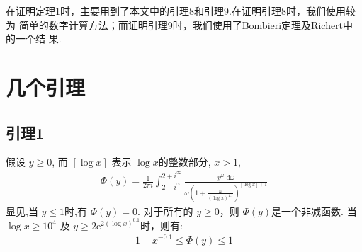 \documentclass{article}
\newcommand{\ee}{\mathrm{e}}
\newcommand{\dd}{\;\mathrm{d}}
\begin{document}
在证明定理1时，主要用到了本文中的引理8和引理9.在证明引理8时，我们使用较为
简单的数字计算方法；而证明引理9时，我们使用了Bombieri定理及Richert中的一个结
果.


\section{几个引理}
\subsection{引理1}
假设 $y\ge 0$, 而 $[\log x]$ 表示 $\log x$的整数部分, $x>1$, 
\begin{align*}
    \Phi(y) = \frac{1}{2\pi i}\int_{2-i^\infty}^{2+i^\infty}\frac{y^{\omega}\dd\omega}{\omega\left(1+\frac{\omega}{(\log x)^{1.1}}\right)^{[\log x]+1}}
\end{align*}
显见,当 $y\le 1$时,有 $\Phi(y) = 0$. 对于所有的 $y\ge 0$，则 $\Phi(y)$是一个非减函数. 当 $\log x\ge 10^4$ 及 
$y\ge 2\ee^{2(\log x)^{0.1}}$时，则有:
\begin{align*}
    1 - x^{-0.1} \le \Phi(y) \le 1
\end{align*}
\end{document}
